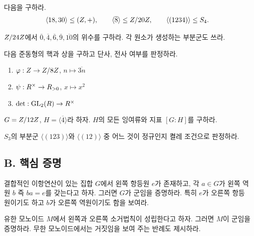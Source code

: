 \begin{exercise}[생성부분군]
다음을 구하라.
\[
  \langle 18,30\rangle\le(Z,+),
  \qquad
  \langle\overline8\rangle\le Z/20Z,
  \qquad
  \langle(1234)\rangle\le S_4.
\]
\end{exercise}

\begin{exercise}
$Z/24Z$에서 $\overline0,\overline4,\overline6,\overline9,\overline{10}$의 위수를 구하라. 각 원소가 생성하는 부분군도 쓰라.
\end{exercise}

\begin{exercise}[준동형의 핵과 상]
다음 준동형의 핵과 상을 구하고 단사, 전사 여부를 판정하라.
\begin{enumerate}[label=(\alph*)]
  \item $\varphi:Z\to Z/8Z$, $n\mapsto\overline{3n}$
  \item $\psi:R^\times\to R_{>0}$, $x\mapsto x^2$
  \item $\det:\operatorname{GL}_2(R)\to R^\times$
\end{enumerate}
\end{exercise}

\begin{exercise}[잉여류]
$G=Z/12Z$, $H=\langle\overline4\rangle$라 하자. $H$의 모든 잉여류와 지표 $[G:H]$를 구하라.
\end{exercise}

\begin{exercise}[정규성 계산]
$S_3$의 부분군 $\langle(123)\rangle$와 $\langle(12)\rangle$ 중 어느 것이 정규인지 켤레 조건으로 판정하라.
\end{exercise}

\subsection*{B. 핵심 증명}

\begin{exercise}
결합적인 이항연산이 있는 집합 $G$에서 왼쪽 항등원 $e$가 존재하고, 각 $a\in G$가 왼쪽 역원 $b$ 즉 $ba=e$를 갖는다고 하자. 그러면 $G$가 군임을 증명하라. 특히 $e$가 오른쪽 항등원이기도 하고 $b$가 오른쪽 역원이기도 함을 보여라.
\end{exercise}

\begin{exercise}
유한 모노이드 $M$에서 왼쪽과 오른쪽 소거법칙이 성립한다고 하자. 그러면 $M$이 군임을 증명하라. 무한 모노이드에서는 거짓임을 보여 주는 반례도 제시하라.
\end{exercise}

